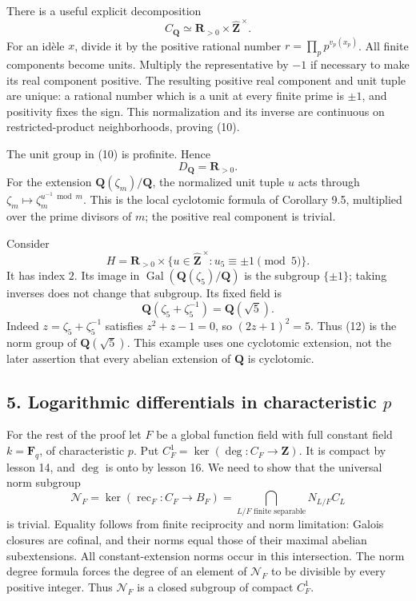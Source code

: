 \documentclass[11pt,a4paper]{article}
\begin{document}
There is a useful explicit decomposition \[
C_{\mathbf Q}\simeq\mathbf R_{>0}\times\widehat{\mathbf Z}^{\,\times}.
\tag{10}
\] For an idèle \(x\), divide it by the positive rational number
\(r=\prod_p p^{v_p(x_p)}\). All finite components become units. Multiply
the representative by \(-1\) if necessary to make its real component
positive. The resulting positive real component and unit tuple are
unique: a rational number which is a unit at every finite prime is
\(\pm1\), and positivity fixes the sign. This normalization and its
inverse are continuous on restricted-product neighborhoods, proving
(10).

The unit group in (10) is profinite. Hence \[
D_{\mathbf Q}=\mathbf R_{>0}.
\tag{11}
\] For the extension \(\mathbf Q(\zeta_m)/\mathbf Q\), the normalized
unit tuple \(u\) acts through \(\zeta_m\mapsto\zeta_m^{u^{-1}\bmod m}\).
This is the local cyclotomic formula of Corollary 9.5, multiplied over
the prime divisors of \(m\); the positive real component is trivial.

Consider \[
H=\mathbf R_{>0}\times
\{u\in\widehat{\mathbf Z}^{\,\times}:u_5\equiv\pm1\pmod5\}.
\tag{12}
\] It has index \(2\). Its image in
\(\operatorname{Gal}(\mathbf Q(\zeta_5)/\mathbf Q)\) is the subgroup
\(\{\pm1\}\); taking inverses does not change that subgroup. Its fixed
field is \[
\mathbf Q(\zeta_5+\zeta_5^{-1})=\mathbf Q(\sqrt5).
\tag{13}
\] Indeed \(z=\zeta_5+\zeta_5^{-1}\) satisfies \(z^2+z-1=0\), so
\((2z+1)^2=5\). Thus (12) is the norm group of \(\mathbf Q(\sqrt5)\).
This example uses one cyclotomic extension, not the later assertion that
every abelian extension of \(\mathbf Q\) is cyclotomic.

\subsection{\texorpdfstring{5. Logarithmic differentials in
characteristic
\(p\)}{5. Logarithmic differentials in characteristic p}}\label{logarithmic-differentials-in-characteristic-p}

For the rest of the proof let \(F\) be a global function field with full
constant field \(k=\mathbf F_q\), of characteristic \(p\). Put
\(C_F^1=\ker(\deg:C_F\to\mathbf Z)\). It is compact by lesson 14, and
\(\deg\) is onto by lesson 16. We need to show that the universal norm
subgroup \[
\mathcal N_F=\ker(\operatorname{rec}_F:C_F\to B_F)
=\bigcap_{L/F\text{ finite separable}}N_{L/F}C_L
\tag{14}
\] is trivial. Equality follows from finite reciprocity and norm
limitation: Galois closures are cofinal, and their norms equal those of
their maximal abelian subextensions. All constant-extension norms occur
in this intersection. The norm degree formula forces the degree of an
element of \(\mathcal N_F\) to be divisible by every positive integer.
Thus \(\mathcal N_F\) is a closed subgroup of compact \(C_F^1\).
\end{document}
